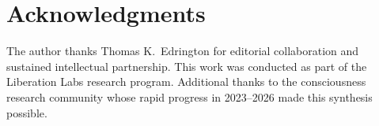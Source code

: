 \documentclass[11pt,letterpaper]{article}
\begin{document}
\section*{Acknowledgments}
The author thanks Thomas K.\ Edrington for editorial collaboration and sustained intellectual partnership. This work was conducted as part of the Liberation Labs research program. Additional thanks to the consciousness research community whose rapid progress in 2023--2026 made this synthesis possible.



\end{document}
